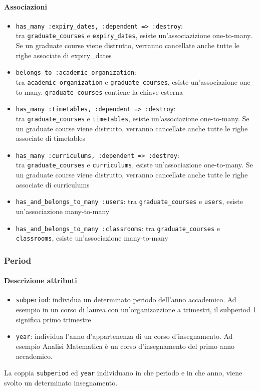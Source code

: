 \documentclass[11pt,a4paper]{article}
\begin{document}
\paragraph{Associazioni}
\begin{itemize}
 \item \verb|has_many :expiry_dates, :dependent => :destroy|:\\ tra \verb|graduate_courses| e \verb|expiry_dates|, esiste un'associazizione one-to-many. Se un graduate course viene distrutto, verranno cancellate anche tutte le righe associate di expiry\_dates
\item \verb|belongs_to :academic_organization|:\\ tra \verb|academic_organization| e \verb|graduate_courses|, esiste un'associazione one to many. \verb|graduate_courses| contiene la chiave esterna
\item \verb|has_many :timetables, :dependent => :destroy|:\\ tra \verb|graduate_courses| e \verb|timetables|, esiste un'associazione one-to-many. Se un graduate course viene distrutto, verranno cancellate anche tutte le righe associate di timetables
\item \verb|has_many :curriculums, :dependent => :destroy|:\\ tra \verb|graduate_courses| e \verb|curriculums|, esiste un'associazione one-to-many. Se un graduate course viene distrutto, verranno cancellate anche tutte le righe associate di curriculums
\item \verb|has_and_belongs_to_many :users|: tra \verb|graduate_courses| e \verb|users|, esiste un'associazione many-to-many 
\item \verb|has_and_belongs_to_many :classrooms|: tra \verb|graduate_courses| e \verb|classrooms|, esiste un'associazione many-to-many
\end{itemize}
\subsubsection{Period}
\paragraph{Descrizione attributi}
\begin{itemize}
 \item \verb|subperiod|: individua un determinato periodo dell'anno accademico. Ad esempio in un corso di laurea con un'organizazzione a trimestri, il subperiod 1 significa primo trimestre
 \item \verb|year|: individua l'anno d'appartenenza di un corso d'insegnamento. Ad esempio Analisi Matematica è un corso d'insegnamento del primo anno accademico.
\end{itemize}
La coppia \verb|subperiod| ed \verb|year| individuano in che periodo e in che anno, viene svolto un determinato insegnamento.
\end{document}

